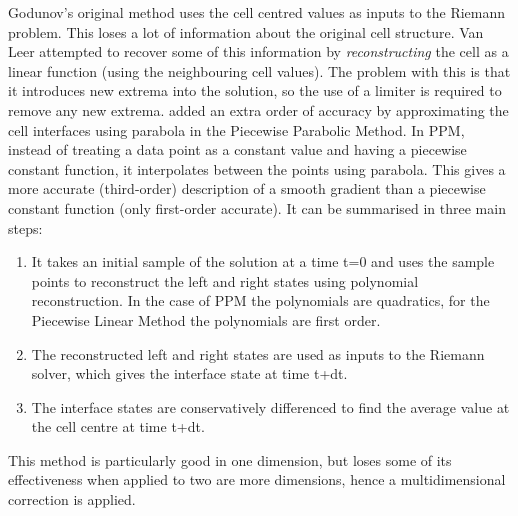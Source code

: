 Godunov's original method uses the cell centred values as inputs to the Riemann problem. 
This loses a lot of information about the original cell structure. 
Van Leer attempted to recover some of this information by \emph{reconstructing} the cell as a linear function (using the neighbouring cell values). 
The problem with this is that it introduces new extrema into the solution, so the use of a limiter is required to remove any new extrema.
\citet{1984jcp_colella_woodward} added an extra order of accuracy by approximating the cell interfaces using parabola in the Piecewise Parabolic Method.
In PPM, instead of treating a data point as a constant value and having a piecewise constant function, it interpolates between the points using parabola. 
This gives a more accurate (third-order) description of a smooth gradient than a piecewise constant function (only first-order accurate).
It can be summarised in three main steps:
\begin{enumerate}
\item It takes an initial sample of the solution at a time t=0 and uses the sample points to reconstruct the left and right states using polynomial reconstruction. 
In the case of PPM the polynomials are quadratics, for the Piecewise Linear Method the polynomials are first order. 
\item The reconstructed left and right states are used as inputs to the Riemann solver, which gives the interface state at time t+dt. 
\item The interface states are conservatively differenced to find the average value at the cell centre at time t+dt.
\end{enumerate}
This method is particularly good in one dimension, but loses some of its effectiveness when applied to two are more dimensions, hence a multidimensional correction is applied.

